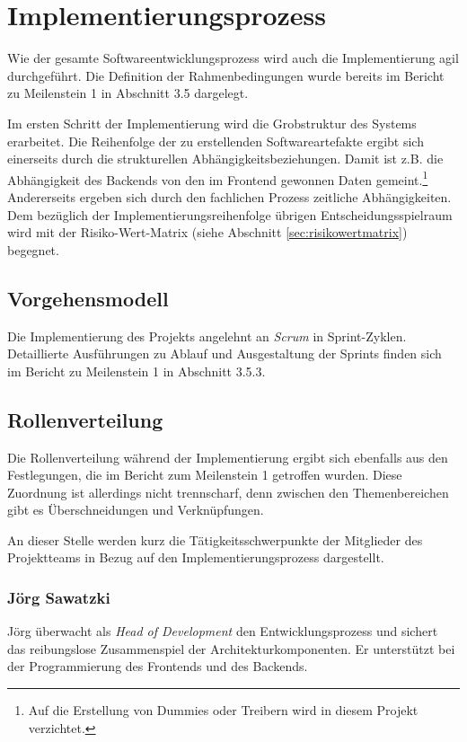 \documentclass[a4paper,11pt,listof=numbered,glossary=totoc,parskip=half,toc=bib]{scrreprt}
\begin{document}
	\section{Implementierungsprozess}
	Wie der gesamte Softwareentwicklungsprozess wird auch die Implementierung agil durchgeführt. Die Definition der Rahmenbedingungen wurde bereits im Bericht zu Meilenstein 1 in Abschnitt 3.5 dargelegt.
	
	Im ersten Schritt der Implementierung wird die Grobstruktur des Systems erarbeitet. Die Reihenfolge der zu erstellenden Softwareartefakte ergibt sich einerseits durch die strukturellen Abhängigkeitsbeziehungen. Damit ist z.B. die Abhängigkeit des Backends von den im Frontend gewonnen Daten gemeint.\footnote{Auf die Erstellung von Dummies oder Treibern wird in diesem Projekt verzichtet.} Andererseits ergeben sich durch den fachlichen Prozess zeitliche Abhängigkeiten. Dem bezüglich der Implementierungsreihenfolge übrigen Entscheidungsspielraum wird mit der Risiko-Wert-Matrix (siehe Abschnitt \ref{sec:risikowertmatrix}) begegnet.
	
	\subsection{Vorgehensmodell}
	
	Die Implementierung des Projekts angelehnt an \textit{Scrum} in Sprint-Zyklen. Detaillierte Ausführungen zu Ablauf und Ausgestaltung der Sprints finden sich im Bericht zu Meilenstein 1 in Abschnitt 3.5.3. 
	
	\subsection{Rollenverteilung}
	Die Rollenverteilung während der Implementierung ergibt sich ebenfalls aus den Festlegungen, die im Bericht zum Meilenstein 1 getroffen wurden. Diese Zuordnung ist allerdings nicht trennscharf, denn zwischen den Themenbereichen gibt es Überschneidungen und Verknüpfungen. 
	
	An dieser Stelle werden kurz die Tätigkeitsschwerpunkte der Mitglieder des Projektteams in Bezug auf den Implementierungsprozess dargestellt.
	
	\subsubsection{Jörg Sawatzki}
	Jörg überwacht als \textit{Head of Development} den Entwicklungsprozess und sichert das reibungslose Zusammenspiel der Architekturkomponenten. Er unterstützt bei der Programmierung des Frontends und des Backends.
	
\end{document}
